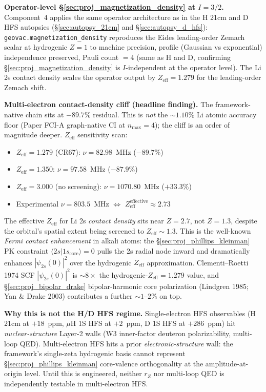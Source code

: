 \documentclass[11pt]{article}
\begin{document}
\textbf{Operator-level \S\ref{sec:proj_magnetization_density} at $I=3/2$.}
Component~4 applies the same operator architecture as in the H 21cm
and D HFS autopsies (\S\ref{sec:autopsy_21cm} and \S\ref{sec:autopsy_d_hfs}):
\texttt{geovac.magnetization\_density} reproduces the Eides leading-order
Zemach scalar at hydrogenic $Z=1$ to machine precision, profile (Gaussian
vs exponential) independence preserved, Pauli count $= 4$ (same as H and D,
confirming \S\ref{sec:proj_magnetization_density} is $I$-independent at the
operator level).  The Li 2s contact density scales the operator output by
$Z_\text{eff} = 1.279$ for the leading-order Zemach shift.

\textbf{Multi-electron contact-density cliff (headline finding).}
The framework-native chain sits at $-89.7\%$ residual.  This is
\emph{not} the $\sim 1.10\%$ Li atomic accuracy floor (Paper FCI-A
graph-native CI at $n_\text{max}=4$); the cliff is an order of magnitude
deeper.  $Z_\text{eff}$ sensitivity scan:

\begin{itemize}\setlength\itemsep{0pt}
\item $Z_\text{eff} = 1.279$ (CR67): $\nu = 82.98$~MHz ($-89.7\%$)
\item $Z_\text{eff} = 1.350$: $\nu = 97.58$~MHz ($-87.9\%$)
\item $Z_\text{eff} = 3.000$ (no screening): $\nu = 1070.80$~MHz ($+33.3\%$)
\item Experimental $\nu = 803.5$~MHz $\Leftrightarrow$
$Z_\text{eff}^\text{effective} \approx 2.73$
\end{itemize}

The effective $Z_\text{eff}$ for Li 2s \emph{contact density} sits
near $Z=2.7$, not $Z=1.3$, despite the orbital's spatial extent being
screened to $Z_\text{eff} \sim 1.3$.  This is the well-known
\emph{Fermi contact enhancement} in alkali atoms: the
\S\ref{sec:proj_phillips_kleinman} PK constraint
$\langle 2s | 1s_\text{core}\rangle = 0$ pulls the 2s radial node
inward and dramatically enhances $|\psi_{2s}(0)|^2$ over the hydrogenic
$Z_\text{eff}$ approximation.  Clementi--Roetti 1974 SCF
$|\psi_{2s}(0)|^2$ is $\sim 8\times$ the hydrogenic-$Z_\text{eff}=1.279$
value, and \S\ref{sec:proj_bipolar_drake} bipolar-harmonic core
polarization (Lindgren 1985; Yan \& Drake 2003) contributes a further
$\sim 1$--$2\%$ on top.

\textbf{Why this is not the H/D HFS regime.}  Single-electron HFS
observables (H 21cm at $+18$~ppm, $\mu$H 1S HFS at $+2$~ppm, D 1S HFS at
$+286$~ppm) hit \emph{nuclear-structure} Layer-2 walls (W3 inner-factor
deuteron polarizability, multi-loop QED).  Multi-electron HFS hits a
prior \emph{electronic-structure} wall: the framework's
single-zeta hydrogenic basis cannot represent
\S\ref{sec:proj_phillips_kleinman} core-valence orthogonality at the
amplitude-at-origin level.  Until this is engineered, neither $r_Z$
nor multi-loop QED is independently testable in multi-electron HFS.
\end{document}
